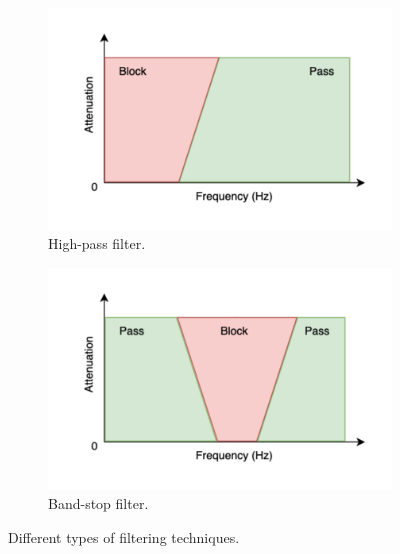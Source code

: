 \begin{figure}[ht]
\begin{subfigure}{0.45\textwidth}
        \centering
        \includegraphics[width=\textwidth]{../images/pipeline/highpass_filter.pdf}
        \captionsetup{width=\linewidth}
        \captionsetup{justification=centering}
        \caption{High-pass filter.}
        \label{fig:processing_signals_filters_highpass}
    \end{subfigure}
    \hfill
    \begin{subfigure}{0.45\textwidth}
        \centering
        \includegraphics[width=\textwidth]{../images/pipeline/bandstop_filter.pdf}
        \captionsetup{width=\linewidth}
        \captionsetup{justification=centering}
        \caption{Band-stop filter.}
        \label{fig:processing_signals_filters_bandstop}
    \end{subfigure}
    \captionsetup{width=\linewidth}
    \captionsetup{justification=centering}
    \caption{Different types of filtering techniques.}
    \label{fig:processing_signals_filters}
\end{figure}

